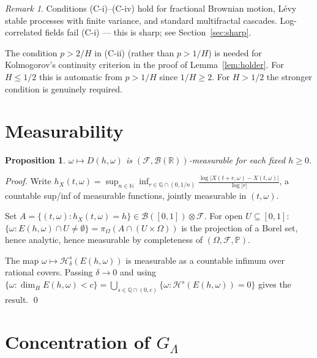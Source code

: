 \documentclass[11pt,a4paper]{article}
\newtheorem{proposition}[theorem]{Proposition}
\theoremstyle{definition}
\theoremstyle{remark}
\newtheorem{remark}[theorem]{Remark}
\newcommand{\R}{\mathbb{R}}
\begin{document}
\begin{remark}
Conditions (C-i)--(C-iv) hold for fractional Brownian motion,
L\'{e}vy stable processes with finite variance, and standard
multifractal cascades. Log-correlated fields fail (C-i) --- this is
sharp; see Section~\ref{sec:sharp}.

The condition $p>2/H$ in (C-ii) (rather than $p>1/H$) is needed for
Kolmogorov's continuity criterion in the proof of
Lemma~\ref{lem:holder}. For $H\le1/2$ this is automatic from $p>1/H$
since $1/H\ge2$. For $H>1/2$ the stronger condition is genuinely
required.
\end{remark}

\section{Measurability}

\begin{proposition}\label{prop:meas}
$\omega\mapsto D(h,\omega)$ is $(\mathcal{F},\mathcal{B}(\R))$-measurable
for each fixed $h\ge0$.
\end{proposition}

\begin{proof}
Write
$h_X(t,\omega)=\sup_{n\in\mathbb{N}}\inf_{r\in\mathbb{Q}\cap(0,1/n)}
\frac{\log|X(t+r,\omega)-X(t,\omega)|}{\log|r|}$,
a countable sup/inf of measurable functions, jointly measurable in
$(t,\omega)$.

Set $A=\{(t,\omega):h_X(t,\omega)=h\}\in\mathcal{B}([0,1])\otimes\mathcal{F}$.
For open $U\subseteq[0,1]$:
$\{\omega:E(h,\omega)\cap U\ne\emptyset\}=\pi_\Omega(A\cap(U\times\Omega))$
is the projection of a Borel set, hence analytic, hence measurable by
completeness of $(\Omega,\mathcal{F},\mathbb{P})$.

The map $\omega\mapsto\mathcal{H}^s_\delta(E(h,\omega))$ is measurable
as a countable infimum over rational covers. Passing $\delta\to0$ and
using $\{\omega:\dim_H E(h,\omega)<c\}=\bigcup_{s\in\mathbb{Q}\cap(0,c)}
\{\omega:\mathcal{H}^s(E(h,\omega))=0\}$ gives the result. \qed
\end{proof}

\section{Concentration of $G_\Lambda$}
\end{document}
